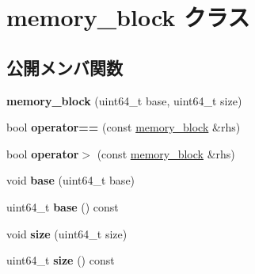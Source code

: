 \hypertarget{classmemory__block}{}\section{memory\+\_\+block クラス}
\label{classmemory__block}
\subsection*{公開メンバ関数}
\begin{DoxyCompactItemize}
\item 
\hypertarget{classmemory__block_a5e72abe346014b328921130d6576ffaa}{}{\bfseries memory\+\_\+block} (uint64\+\_\+t base, uint64\+\_\+t size)\label{classmemory__block_a5e72abe346014b328921130d6576ffaa}

\item 
\hypertarget{classmemory__block_a2622810f660307cb9d39516973abac9b}{}bool {\bfseries operator==} (const \hyperlink{classmemory__block}{memory\+\_\+block} \&rhs)\label{classmemory__block_a2622810f660307cb9d39516973abac9b}

\item 
\hypertarget{classmemory__block_abba4d7c05d916aafc08b58187fd92fad}{}bool {\bfseries operator$>$} (const \hyperlink{classmemory__block}{memory\+\_\+block} \&rhs)\label{classmemory__block_abba4d7c05d916aafc08b58187fd92fad}

\item 
\hypertarget{classmemory__block_a739d675f86d7e2a9f0082b2e6e4d827f}{}void {\bfseries base} (uint64\+\_\+t base)\label{classmemory__block_a739d675f86d7e2a9f0082b2e6e4d827f}

\item 
\hypertarget{classmemory__block_a4529412870636277c2bc5589ba841839}{}uint64\+\_\+t {\bfseries base} () const \label{classmemory__block_a4529412870636277c2bc5589ba841839}

\item 
\hypertarget{classmemory__block_adb448dde189fdedec8793fd3dcb4674a}{}void {\bfseries size} (uint64\+\_\+t size)\label{classmemory__block_adb448dde189fdedec8793fd3dcb4674a}

\item 
\hypertarget{classmemory__block_a2c603c159e4652aec8af10818682d8f4}{}uint64\+\_\+t {\bfseries size} () const \label{classmemory__block_a2c603c159e4652aec8af10818682d8f4}

\end{DoxyCompactItemize}
